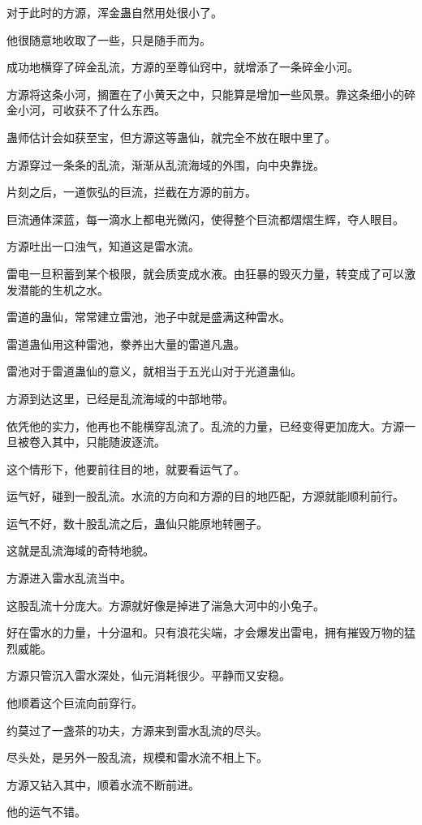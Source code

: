 \begin{this_body}
对于此时的方源，浑金蛊自然用处很小了。

他很随意地收取了一些，只是随手而为。

成功地横穿了碎金乱流，方源的至尊仙窍中，就增添了一条碎金小河。

方源将这条小河，搁置在了小黄天之中，只能算是增加一些风景。靠这条细小的碎金小河，可收获不了什么东西。

蛊师估计会如获至宝，但方源这等蛊仙，就完全不放在眼中里了。

方源穿过一条条的乱流，渐渐从乱流海域的外围，向中央靠拢。

片刻之后，一道恢弘的巨流，拦截在方源的前方。

巨流通体深蓝，每一滴水上都电光微闪，使得整个巨流都熠熠生辉，夺人眼目。

方源吐出一口浊气，知道这是雷水流。

雷电一旦积蓄到某个极限，就会质变成水液。由狂暴的毁灭力量，转变成了可以激发潜能的生机之水。

雷道的蛊仙，常常建立雷池，池子中就是盛满这种雷水。

雷道蛊仙用这种雷池，豢养出大量的雷道凡蛊。

雷池对于雷道蛊仙的意义，就相当于五光山对于光道蛊仙。

方源到达这里，已经是乱流海域的中部地带。

依凭他的实力，他再也不能横穿乱流了。乱流的力量，已经变得更加庞大。方源一旦被卷入其中，只能随波逐流。

这个情形下，他要前往目的地，就要看运气了。

运气好，碰到一股乱流。水流的方向和方源的目的地匹配，方源就能顺利前行。

运气不好，数十股乱流之后，蛊仙只能原地转圈子。

这就是乱流海域的奇特地貌。

方源进入雷水乱流当中。

这股乱流十分庞大。方源就好像是掉进了湍急大河中的小兔子。

好在雷水的力量，十分温和。只有浪花尖端，才会爆发出雷电，拥有摧毁万物的猛烈威能。

方源只管沉入雷水深处，仙元消耗很少。平静而又安稳。

他顺着这个巨流向前穿行。

约莫过了一盏茶的功夫，方源来到雷水乱流的尽头。

尽头处，是另外一股乱流，规模和雷水流不相上下。

方源又钻入其中，顺着水流不断前进。

他的运气不错。


\end{this_body}
